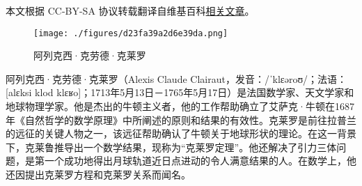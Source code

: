 
本文根据 CC-BY-SA 协议转载翻译自维基百科\href{https://en.wikipedia.org/wiki/Alexis_Clairaut}{相关文章}。
\begin{figure}[ht]
\centering
\texttt{[image: ./figures/d23fa39a2d6e39da.png]}
\caption{阿列克西·克劳德·克莱罗} \label{fig_Alexis_1}
\end{figure}
阿列克西·克劳德·克莱罗（Alexis Claude Clairaut，发音：/ˈklɛəroʊ/；法语：[alɛksi klod klɛʁo]；1713年5月13日－1765年5月17日）是法国数学家、天文学家和地球物理学家。他是杰出的牛顿主义者，他的工作帮助确立了艾萨克·牛顿在1687年《自然哲学的数学原理》中所阐述的原则和结果的有效性。克莱罗是前往拉普兰的远征的关键人物之一，该远征帮助确认了牛顿关于地球形状的理论。在这一背景下，克莱鲁推导出一个数学结果，现称为“克莱罗定理”。他还解决了引力三体问题，是第一个成功地得出月球轨道近日点进动的令人满意结果的人。在数学上，他还因提出克莱罗方程和克莱罗关系而闻名。

